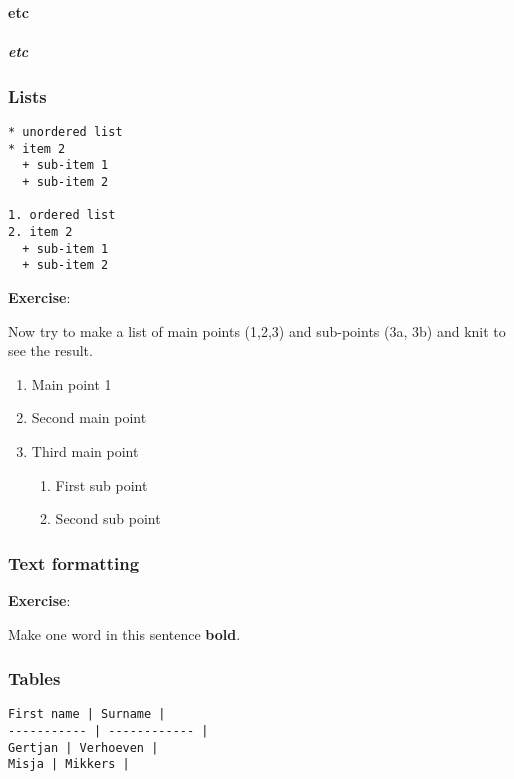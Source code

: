 \documentclass[
]{article}
\providecommand{\tightlist}{%
  \setlength{\itemsep}{0pt}\setlength{\parskip}{0pt}}
\begin{document}
\hypertarget{etc}{%
\paragraph{etc}\label{etc}}

\hypertarget{etc-1}{%
\subparagraph{etc}\label{etc-1}}

\hypertarget{lists}{%
\subsubsection{Lists}\label{lists}}

\begin{verbatim}
* unordered list 
* item 2
  + sub-item 1
  + sub-item 2
  
1. ordered list
2. item 2
  + sub-item 1
  + sub-item 2
\end{verbatim}

\textbf{Exercise}:

Now try to make a list of main points (1,2,3) and sub-points (3a, 3b)
and knit to see the result.

\begin{enumerate}
\def\labelenumi{\arabic{enumi}.}
\tightlist
\item
  Main point 1
\item
  Second main point
\item
  Third main point

  \begin{enumerate}
  \def\labelenumii{\alph{enumii}.}
  \tightlist
  \item
    First sub point
  \item
    Second sub point
  \end{enumerate}
\end{enumerate}

\hypertarget{text-formatting}{%
\subsubsection{Text formatting}\label{text-formatting}}

\textbf{Exercise}:

Make one word in this sentence \textbf{bold}.

\hypertarget{tables}{%
\subsubsection{Tables}\label{tables}}

\begin{verbatim}
First name | Surname |
----------- | ------------ |
Gertjan | Verhoeven |
Misja | Mikkers |
\end{verbatim}
\end{document}
